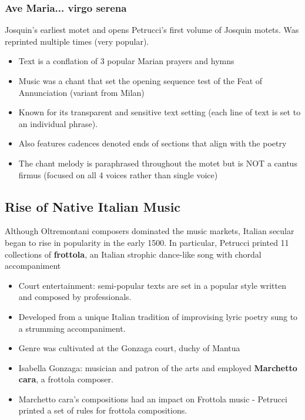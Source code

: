 \documentclass{article}
\begin{document}
  \subsubsection{Ave Maria... virgo serena}
  Josquin's earliest motet and opens Petrucci's first volume of Josquin motets. Was reprinted multiple times (very popular).
  \begin{itemize}
    \item Text is a conflation of 3 popular Marian prayers and hymns
    \item Music was a chant that set the opening sequence test of the Feat of Annunciation (variant from Milan)
    \item Known for its transparent and sensitive text setting (each line of text is set to an individual phrase).
    \item Also features cadences denoted ends of sections that align with the poetry 
    \item The chant melody is paraphrased throughout the motet but is NOT a cantus firmus (focused on all 4 voices rather than single voice)
  \end{itemize}
  \subsection{Rise of Native Italian Music}
  Although Oltremontani composers dominated the music markets, Italian secular began to rise in popularity in the early 1500. In particular, Petrucci printed 11 collections of \textbf{frottola}, an Italian strophic dance-like song with chordal accompaniment
  \begin{itemize}
    \item Court entertainment: semi-popular texts are set in a popular style written and composed by professionals.
    \item Developed from a unique Italian tradition of improvising lyric poetry sung to a strumming accompaniment.
    \item Genre was cultivated at the Gonzaga court, duchy of Mantua
    \item Isabella Gonzaga: musician and patron of the arts and employed \textbf{Marchetto cara}, a frottola composer.
    \item Marchetto cara's compositions had an impact on Frottola music - Petrucci printed a set of rules for frottola compositions.
  \end{itemize}
\end{document}
